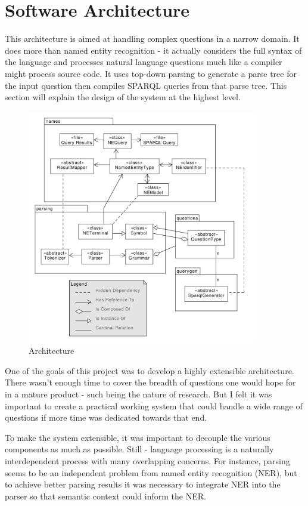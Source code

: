\documentclass[11pt]{article}
\begin{document}
\section{Software Architecture}

This architecture is aimed at handling complex questions in a narrow domain.
It does more than named entity recognition - it actually considers
the full syntax of the language and processes natural language questions
much like a compiler might process source code. It uses
top-down parsing to generate a parse tree for the input question then
compiles SPARQL queries from that parse tree.
This section will explain the design of the system at the highest level.

\begin{figure}[h!]
    \centering
    \includegraphics[width=0.9\textwidth,natwidth=1,natheight=1]{umlet/architecture.pdf}
    \caption{Architecture}
    \label{fig:arch}
\end{figure}


One of the goals of this project was to develop a
highly extensible architecture. There wasn't enough time to cover the
breadth of questions one would hope for in a mature product - such being
the nature of research. But I felt it was important to create a practical
working system that could handle a wide range of questions if more
time was dedicated towards that end.

To make the system extensible, it was important to decouple the various
components as much as possible. Still - language processing is a naturally
interdependent process with many overlapping concerns. For instance,
parsing seems to be an independent problem from named entity recognition (NER),
but to achieve better parsing results it was necessary to integrate NER into the
parser so that semantic context could inform the NER. 
\end{document}
